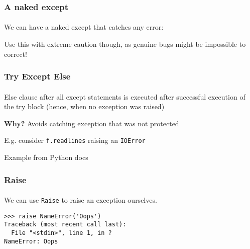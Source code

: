 \begin{frame}\frametitle{A naked except}
    \framesubtitle{}

    We can have a naked except that catches any error:

    Use this with extreme caution though, as genuine bugs might be impossible
    to correct!

\end{frame}

\begin{frame}\frametitle{Try Except Else}
    \framesubtitle{}

    Else clause after all except statements is executed after successful
    execution of the try block (hence, when no exception was raised)


    \textbf{Why?} Avoids catching exception that was not protected

    E.g. consider \texttt{f.readlines} raising an \texttt{IOError}

    \vfill

    \scriptsize{Example from Python docs}

\end{frame}

\begin{frame}[fragile]\frametitle{Raise}
    \framesubtitle{}

    We can use \texttt{Raise} to raise an exception ourselves.

    \begin{verbatim}
>>> raise NameError('Oops')
Traceback (most recent call last):
  File "<stdin>", line 1, in ?
NameError: Oops
    \end{verbatim}

\end{frame}





